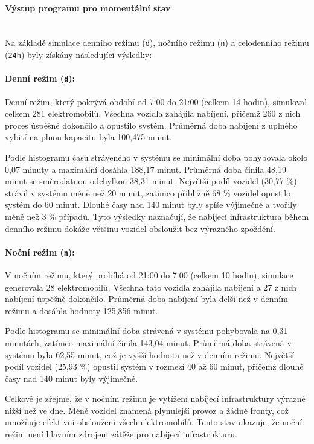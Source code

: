 \documentclass[a4paper,11pt]{article}
\begin{document}
\paragraph{Výstup programu pro momentální stav\\\\}

Na základě simulace denního režimu (\texttt{d}), nočního režimu (\texttt{n}) a celodenního režimu (\texttt{24h}) byly získány následující výsledky:

\paragraph{Denní režim (\texttt{d}):} 
Denní režim, který pokrývá období od 7:00 do 21:00 (celkem 14 hodin), simuloval celkem 281 elektromobilů. Všechna vozidla zahájila nabíjení, přičemž 260 z nich proces úspěšně dokončilo a opustilo systém. Průměrná doba nabíjení z úplného vybití na plnou kapacitu byla 100,475 minut.

Podle histogramu času stráveného v systému se minimální doba pohybovala okolo 0,07 minuty a maximální dosáhla 188,17 minut. Průměrná doba činila 48,19 minut se směrodatnou odchylkou 38,31 minut. Největší podíl vozidel (30,77 \%) strávil v systému méně než 20 minut, zatímco přibližně 68 \% vozidel opustilo systém do 60 minut. Dlouhé časy nad 140 minut byly spíše výjimečné a tvořily méně než 3 \% případů. Tyto výsledky naznačují, že nabíjecí infrastruktura během denního režimu dokáže většinu vozidel obsloužit bez výrazného zpoždění.

\paragraph{Noční režim (\texttt{n}):}
V nočním režimu, který probíhá od 21:00 do 7:00 (celkem 10 hodin), simulace generovala 28 elektromobilů. Všechna tato vozidla zahájila nabíjení a 27 z nich nabíjení úspěšně dokončilo. Průměrná doba nabíjení byla delší než v denním režimu a dosáhla hodnoty 125,856 minut.

Podle histogramu se minimální doba strávená v systému pohybovala na 0,31 minutách, zatímco maximální činila 143,04 minut. Průměrná doba strávená v systému byla 62,55 minut, což je vyšší hodnota než v denním režimu. Největší podíl vozidel (25,93 \%) opustil systém v rozmezí 40 až 60 minut, přičemž dlouhé časy nad 140 minut byly výjimečné.

Celkově je zřejmé, že v nočním režimu je vytížení nabíjecí infrastruktury výrazně nižší než ve dne. Méně vozidel znamená plynulejší provoz a žádné fronty, což umožňuje efektivní obsloužení všech elektromobilů. Tento stav ukazuje, že noční režim není hlavním zdrojem zátěže pro nabíjecí infrastrukturu.
\end{document}
